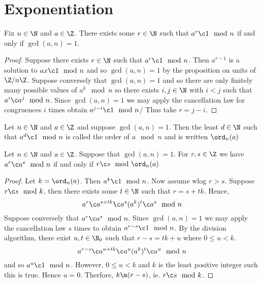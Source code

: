 

\section{Exponentiation}

\begin{nprop}
 Fix $n \in \N$ and $a \in \Z$. There exists some $r \in \N$ such that $a^r \c 1 \mod n$ if and only if $\gcd(a, n) = 1$.
\end{nprop}

\begin{proof}
  Suppose there exists $r \in \N$ such that $a^r \c 1 \mod n$. Then $a^{r-1}$ is a solution to $ax \c 1 \mod n$ and so $\gcd(a, n) = 1$ by the proposition on units of $\Z/n\Z$. Suppose conversely that $\gcd(a, n) = 1$ and so there are only finitely many possible values of $a^k \mod n$ so there exists $i, j \in \N$ with $i < j$ such that $a^i \c a^j\mod n$. Since $\gcd(a, n) = 1$ we may apply the cancellation law for congruences $i$ times obtain $a^{j-i}\c 1\mod n$/ Thus take $r = j-i$.
\end{proof}

\begin{ndefi}[Order]
  Let $n \in \N$ and $a \in \Z$ and suppose $\gcd(a, n) = 1$. Then the least $d \in \N$ such that $a^d \c 1 \mod n$ is called the order of $a\mod n$ and is written $\ord_n(a)$
\end{ndefi}

\begin{nprop}
   Let $n \in \N$ and $a\in \Z$. Suppose that $\gcd(a, n) = 1$. For $r, s \in \Z$ we have $a^r \c a^s \mod n$ if and only if $r \c s \mod \ord_n(a)$
\end{nprop}
\begin{proof}
  Let $k =\ord_n(a)$. Then $a^k \c 1 \mod n$. Now assume wlog $r > s$. Suppose $r \c s \mod k$, then there exists some $t \in \N$ such that $r = s + tk$. Hence,
  $$ a^r \c a^{s + tk} \c a^s(a^k)^t \c a^s \mod n $$
  Suppose conversely that $a^r \c a^s \mod n$. Since $\gcd(a, n)= 1$ we may apply the cancellation law $s$ times to obtain $a^{r - s}\c 1 \mod n$. By the division algorithm, there exist $u, t \in \N_0$ such that $r - s = tk + u$ where $0 \le u < k$.\\
  $$ a^{r-s} \c a^{u+tk} \c a^u(a^k)^t \c a^u\mod n $$
  and so $a^u\c 1 \mod n$. However, $0 \le u  < k$ and $k$ is the least positive integer such this is true. Hence $u = 0$. Therfore, $k \m (r - s)$, ie. $r \c s \mod k$.
\end{proof}


